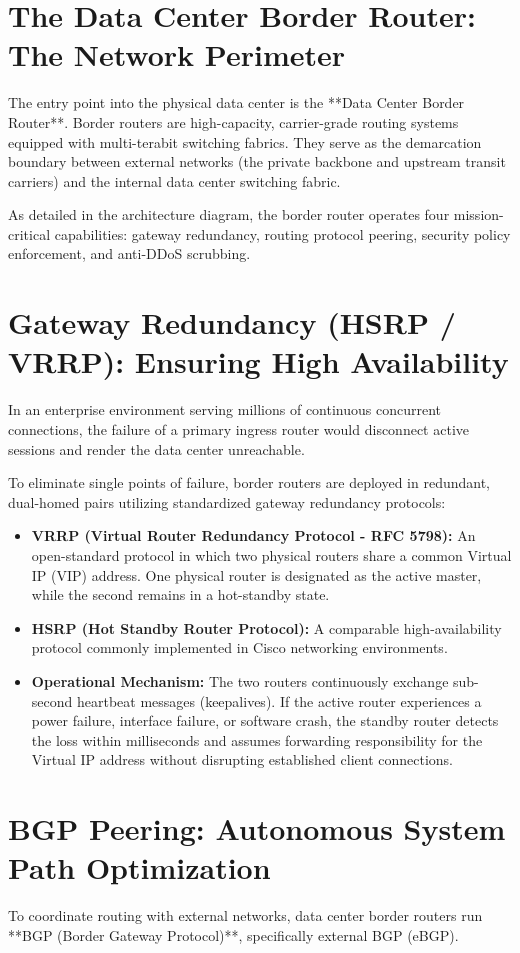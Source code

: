 \documentclass[12pt,a4paper]{report}
\begin{document}
\section{The Data Center Border Router: The Network Perimeter}
The entry point into the physical data center is the **Data Center Border Router**. Border routers are high-capacity, carrier-grade routing systems equipped with multi-terabit switching fabrics. They serve as the demarcation boundary between external networks (the private backbone and upstream transit carriers) and the internal data center switching fabric.

As detailed in the architecture diagram, the border router operates four mission-critical capabilities: gateway redundancy, routing protocol peering, security policy enforcement, and anti-DDoS scrubbing.

\section{Gateway Redundancy (HSRP / VRRP): Ensuring High Availability}
In an enterprise environment serving millions of continuous concurrent connections, the failure of a primary ingress router would disconnect active sessions and render the data center unreachable.

To eliminate single points of failure, border routers are deployed in redundant, dual-homed pairs utilizing standardized gateway redundancy protocols:
\begin{itemize}[leftmargin=1.2cm]
    \item \textbf{VRRP (Virtual Router Redundancy Protocol - RFC 5798):} An open-standard protocol in which two physical routers share a common Virtual IP (VIP) address. One physical router is designated as the active master, while the second remains in a hot-standby state.
    \item \textbf{HSRP (Hot Standby Router Protocol):} A comparable high-availability protocol commonly implemented in Cisco networking environments.
    \item \textbf{Operational Mechanism:} The two routers continuously exchange sub-second heartbeat messages (keepalives). If the active router experiences a power failure, interface failure, or software crash, the standby router detects the loss within milliseconds and assumes forwarding responsibility for the Virtual IP address without disrupting established client connections.
\end{itemize}

\section{BGP Peering: Autonomous System Path Optimization}
To coordinate routing with external networks, data center border routers run **BGP (Border Gateway Protocol)**, specifically external BGP (eBGP).
\end{document}
